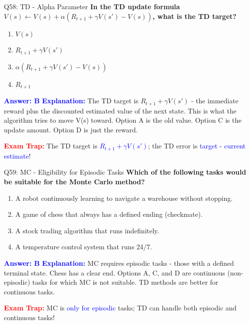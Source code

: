 \documentclass[8pt]{beamer}
\begin{document}
	\begin{frame}{Q58: TD - Alpha Parameter}
		\fontsize{6.5}{7.5}\selectfont
		\textbf{In the TD update formula $V(s) \leftarrow V(s) + \alpha(R_{t+1} + \gamma V(s') - V(s))$, what is the TD target?}
		
		\begin{enumerate}
			\item $V(s)$
			\item $R_{t+1} + \gamma V(s')$
			\item $\alpha(R_{t+1} + \gamma V(s') - V(s))$
			\item $R_{t+1}$
		\end{enumerate}
		
		\vspace{0.1cm}
		\textcolor{blue}{\textbf{Answer: B}}
		\vspace{0.1cm}
		\textcolor{blue}{\textbf{Explanation:}} The TD target is $R_{t+1} + \gamma V(s')$ - the immediate reward plus the discounted estimated value of the next state. This is what the algorithm tries to move V(s) toward. Option A is the old value. Option C is the update amount. Option D is just the reward.
		
		\textcolor{red}{\textbf{Exam Trap:}} The TD target is \textcolor{blue}{$R_{t+1} + \gamma V(s')$}; the TD error is \textcolor{blue}{target - current estimate}!
	\end{frame}
	
	\begin{frame}{Q59: MC - Eligibility for Episodic Tasks}
		\fontsize{6.5}{7.5}\selectfont
		\textbf{Which of the following tasks would be suitable for the Monte Carlo method?}
		
		\begin{enumerate}
			\item A robot continuously learning to navigate a warehouse without stopping.
			\item A game of chess that always has a defined ending (checkmate).
			\item A stock trading algorithm that runs indefinitely.
			\item A temperature control system that runs 24/7.
		\end{enumerate}
		
		\vspace{0.1cm}
		\textcolor{blue}{\textbf{Answer: B}}
		\vspace{0.1cm}
		\textcolor{blue}{\textbf{Explanation:}} MC requires episodic tasks - those with a defined terminal state. Chess has a clear end. Options A, C, and D are continuous (non-episodic) tasks for which MC is not suitable. TD methods are better for continuous tasks.
		
		\textcolor{red}{\textbf{Exam Trap:}} MC is \textcolor{blue}{only for episodic} tasks; TD can handle both episodic and continuous tasks!
	\end{frame}
	
\end{document}
